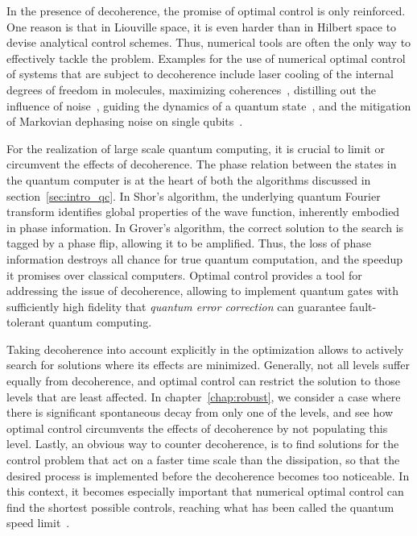 In the presence of decoherence, the promise of optimal control is
only reinforced. One reason is that in Liouville space, it is even harder than
in Hilbert space to devise analytical control schemes. Thus, numerical tools are
often the only way to effectively tackle the problem. Examples for the use of
numerical optimal control of systems that are subject to decoherence include
laser cooling of the internal degrees of freedom in molecules, maximizing
coherences~\cite{OhtsukiJCP99}, distilling out the influence of
noise~\cite{KallushPRA06}, guiding the dynamics of a quantum
state~\cite{TremblayPRA08}, and the mitigation of Markovian dephasing noise on
single qubits~\cite{GormanPRA12}.

For the realization of large scale quantum computing, it is crucial to limit or
circumvent the effects of decoherence.
The phase relation between the states in the quantum computer is at the heart of
both the algorithms discussed in section~\ref{sec:intro_qc}. In Shor's
algorithm, the underlying quantum Fourier transform identifies global
properties of the wave function, inherently embodied in phase information. In
Grover's algorithm, the correct solution to the search is tagged by a phase flip,
allowing it to be amplified. Thus, the loss of phase information destroys all
chance for true quantum computation, and the speedup it promises over classical
computers. Optimal control provides a tool for addressing the issue of
decoherence, allowing to implement quantum gates with sufficiently high fidelity
that \emph{quantum error correction} can guarantee fault-tolerant quantum
computing.

Taking decoherence into account explicitly in the optimization allows to actively
search for solutions where its effects are minimized. Generally, not all levels
suffer equally from decoherence, and optimal control can restrict the solution to
those levels that are least affected. In chapter~\ref{chap:robust}, we consider
a case where there is significant spontaneous decay from only one of the levels,
and see how optimal control circumvents the effects of decoherence by not
populating this level. Lastly, an obvious way to counter decoherence, is to find
solutions for the control problem that act on a faster time scale than the
dissipation, so that the desired process is implemented before the decoherence
becomes too noticeable. In this context, it becomes especially important that
numerical optimal control can find the shortest possible controls, reaching what
has been called the quantum speed
limit~\cite{CampoPRL2013,LevitinPRL2009,MargolusPD1998,BhattacharyyaJPA1983,GoerzJPB11}.



